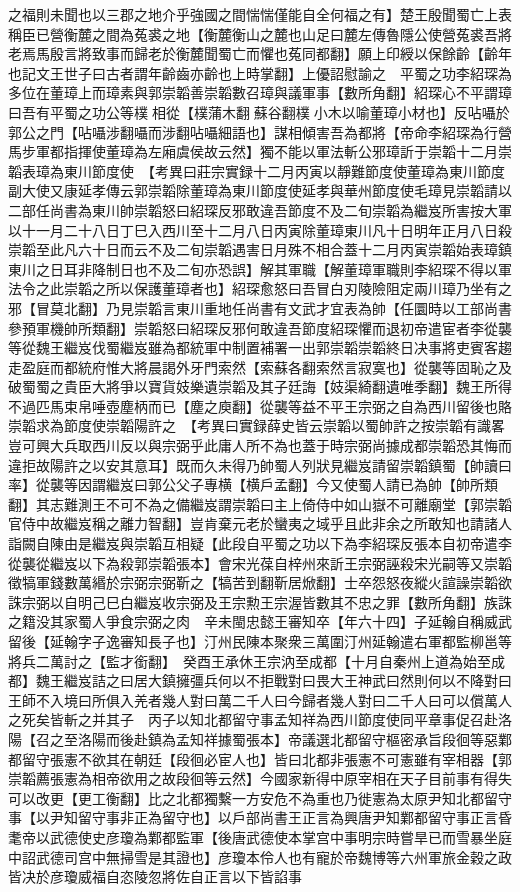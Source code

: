 之福則未聞也以三郡之地介乎強國之間惴惴僅能自全何福之有】楚王殷聞蜀亡上表稱臣已營衡麓之間為菟裘之地【衡麓衡山之麓也山足曰麓左傳魯隱公使營菟裘吾將老焉馬殷言將致事而歸老於衡麓聞蜀亡而懼也菟同都翻】願上印綬以保餘齡【齡年也記文王世子曰古者謂年齡齒亦齡也上時掌翻】上優詔慰諭之　平蜀之功李紹琛為多位在董璋上而璋素與郭崇韜善崇韜數召璋與議軍事【數所角翻】紹琛心不平謂璋曰吾有平蜀之功公等樸相從【樸蒲木翻蘇谷翻樸小木以喻董璋小材也】反呫囁於郭公之門【呫囁涉翻囁而涉翻呫囁細語也】謀相傾害吾為都將【帝命李紹琛為行營馬步軍都指揮使董璋為左廂虞侯故云然】獨不能以軍法斬公邪璋訢于崇韜十二月崇韜表璋為東川節度使　【考異曰莊宗實録十二月丙寅以靜難節度使董璋為東川節度副大使又康延孝傳云郭崇韜除董璋為東川節度使延孝與華州節度使毛璋見崇韜請以二部任尚書為東川帥崇韜怒曰紹琛反邪敢違吾節度不及二旬崇韜為繼岌所害按大軍以十一月二十八日丁巳入西川至十二月八日丙寅除董璋東川凡十日明年正月八日殺崇韜至此凡六十日而云不及二旬崇韜遇害日月殊不相合蓋十二月丙寅崇韜始表璋鎮東川之日耳非降制日也不及二旬亦恐誤】解其軍職【解董璋軍職則李紹琛不得以軍法令之此崇韜之所以保護董璋者也】紹琛愈怒曰吾冒白刃陵險阻定兩川璋乃坐有之邪【冒莫北翻】乃見崇韜言東川重地任尚書有文武才宜表為帥【任圜時以工部尚書參預軍機帥所類翻】崇韜怒曰紹琛反邪何敢違吾節度紹琛懼而退初帝遣宦者李從襲等從魏王繼岌伐蜀繼岌雖為都統軍中制置補署一出郭崇韜崇韜終日决事將吏賓客趨走盈庭而都統府惟大將晨謁外牙門索然【索蘇各翻索然言寂寞也】從襲等固恥之及破蜀蜀之貴臣大將爭以寶貨妓樂遺崇韜及其子廷誨【妓渠綺翻遺唯季翻】魏王所得不過匹馬束帛唾壺塵柄而已【塵之庾翻】從襲等益不平王宗弼之自為西川留後也賂崇韜求為節度使崇韜陽許之　【考異曰實録薛史皆云崇韜以蜀帥許之按崇韜有識畧豈可興大兵取西川反以與宗弼乎此庸人所不為也蓋于時宗弼尚據成都崇韜恐其悔而違拒故陽許之以安其意耳】既而久未得乃帥蜀人列狀見繼岌請留崇韜鎮蜀【帥讀曰率】從襲等因謂繼岌曰郭公父子專横【横戶孟翻】今又使蜀人請已為帥【帥所類翻】其志難測王不可不為之備繼岌謂崇韜曰主上倚侍中如山嶽不可離廟堂【郭崇韜官侍中故繼岌稱之離力智翻】豈肯棄元老於蠻夷之域乎且此非余之所敢知也請諸人詣闕自陳由是繼岌與崇韜互相疑【此段自平蜀之功以下為李紹琛反張本自初帝遣李從襲從繼岌以下為殺郭崇韜張本】會宋光葆自梓州來訢王宗弼誣殺宋光嗣等又崇韜徵犒軍錢數萬緡於宗弼宗弼靳之【犒苦到翻靳居焮翻】士卒怨怒夜縱火諠譟崇韜欲誅宗弼以自明己巳白繼岌收宗弼及王宗勲王宗渥皆數其不忠之罪【數所角翻】族誅之籍没其家蜀人爭食宗弼之肉　辛未閩忠懿王審知卒【年六十四】子延翰自稱威武留後【延翰字子逸審知長子也】汀州民陳本聚衆三萬圍汀州延翰遣右軍都監柳邕等將兵二萬討之【監才銜翻】　癸酉王承休王宗汭至成都【十月自秦州上道為始至成都】魏王繼岌詰之曰居大鎮擁彊兵何以不拒戰對曰畏大王神武曰然則何以不降對曰王師不入境曰所俱入羌者幾人對曰萬二千人曰今歸者幾人對曰二千人曰可以償萬人之死矣皆斬之并其子　丙子以知北都留守事孟知祥為西川節度使同平章事促召赴洛陽【召之至洛陽而後赴鎮為孟知祥據蜀張本】帝議選北都留守樞密承旨段徊等惡鄴都留守張憲不欲其在朝廷【段徊必宦人也】皆曰北都非張憲不可憲雖有宰相器【郭崇韜薦張憲為相帝欲用之故段徊等云然】今國家新得中原宰相在天子目前事有得失可以改更【更工衡翻】比之北都獨繫一方安危不為重也乃徙憲為太原尹知北都留守事【以尹知留守事非正為留守也】以戶部尚書王正言為興唐尹知鄴都留守事正言昏耄帝以武德使史彦瓊為鄴都監軍【後唐武德使本掌宫中事明宗時嘗旱已而雪暴坐庭中詔武德司宫中無掃雪是其證也】彦瓊本伶人也有寵於帝魏博等六州軍旅金穀之政皆决於彦瓊威福自恣陵忽將佐自正言以下皆諂事